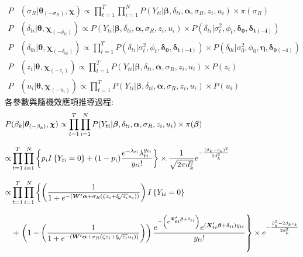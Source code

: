 \documentclass[12pt,a4paper]{article}
\begin{document}
\begin{CJK}{UTF8}{bkai}
\begin{align*}
 P & (\sigma_R|\bm{\theta}_{(-\sigma_R)},\bm{\chi}) \propto \prod_{t=1}^T \prod_{i=1}^N P(Y_{ti}|\bm{\beta},\delta_{ti},\bm{\alpha},\sigma_R,z_i,u_i) \times \pi(\sigma_R) \\[3mm]
 P & (\delta_{ti}|\bm{\theta},\bm{\chi}_{(-\delta_{ti})}) \propto P(Y_{ti}|\bm{\beta},\delta_{ti},\bm{\alpha},\sigma_R,z_i,u_i) \times P(\delta_{ti}|\sigma_t^2,\phi_t,\bm{\delta_0},\bm{\delta_{t(-i)}}) \\[3mm]
 P & (\delta_{0i}|\bm{\theta},\bm{\chi}_{(-\delta_{0i})}) \propto \prod_{t=1}^T P(\delta_{ti}|\sigma_t^2,\phi_t,\bm{\delta_0},\bm{\delta_{t(-i)}}) \times P(\delta_{0i}|\sigma_0^2,\phi_0,\bm{\eta},\bm{\delta_{0(-i)}}) \\[3mm]
 P & (z_i|\bm{\theta},\bm{\chi}_{(-z_i)}) \propto \prod_{t=1}^T P(Y_{ti}|\bm{\beta},\delta_{ti},\bm{\alpha},\sigma_R,z_i,u_i) \times P(z_i) \\[3mm]
 P & (u_i|\bm{\theta},\bm{\chi}_{(-u_i)}) \propto \prod_{t=1}^T P(Y_{ti}|\bm{\beta},\delta_{ti},\bm{\alpha},\sigma_R,z_i,u_i) \times P(u_i)
 \end{align*}
各參數與隨機效應項推導過程:
\begin{align*}
 \setlength\abovedisplayskip{25pt}
 \setlength\belowdisplayskip{25pt}
 P & (\beta_k|\bm{\theta}_{(-\beta_k)},\bm{\chi}) \propto \prod_{t=1}^T\prod_{i=1}^N P(Y_{ti}|\bm{\beta},\delta_{ti},\bm{\alpha},\sigma_R,z_i,u_i) \times \pi(\bm{\beta}) \\[3mm]
 \propto  &
\prod_{t=1}^T\prod_{i=1}^N \left\{ p_i I \left\{ Y_{ti} = 0 \right\}+(1-p_i)\frac{e^{-\lambda_{ti}}\lambda_{ti}^{y_{ti}}}{y_{ti}!}\right\} \times \frac{1}{\sqrt{2 \pi d_k^2}}e^{-\frac{(\beta_k-c_k)^2}{2 d_k^2}} \\[3mm]
 \propto  &
\prod_{t=1}^T\prod_{i=1}^N \left\{ \left( \frac{1}{1+e^{-(\bm{W^\prime}\bm{\alpha}+\sigma_R(\zeta z_i+\xi \sqrt[]{z_i} u_i))}} \right)I\left\{ Y_{ti} = 0\right\} \right.\\[3mm]
& + \left. \left(1-\left( \frac{1}{1+e^{-(\bm{W^\prime}\bm{\alpha}+\sigma_R(\zeta z_i+\xi \sqrt[]{z_i} u_i))}} \right)\right)\frac{e^{-\left(e^{\bm{X_{ti}^\prime\bm{\beta}}+\delta_{ti}}\right)}e^{(\bm{X_{ti}^\prime\bm{\beta}}+\delta_{ti})y_{ti}}}{y_{ti}!}\right\} \times e^{-\frac{\beta_{k}^2-2\beta_k c_k}{2 d_k^2}}\\[3mm]
\\ \hspace*{\fill} \\

\end{align*}
\end{CJK}
\end{document}
